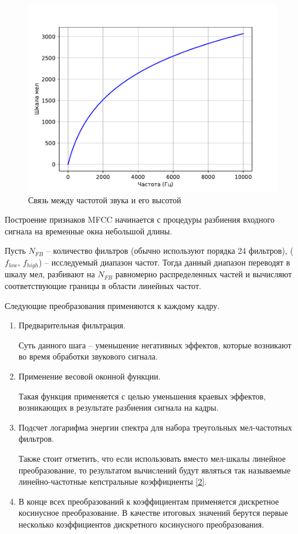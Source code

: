 \begin{figure}[h!]
	\begin{center}
	\includegraphics[pages=-]{./inc/img/1.pdf}
	\caption{Связь между частотой звука и его высотой}  
	\label{fig:xray}
\end{center}
\end{figure}

Построение признаков MFCC начинается с процедуры разбиения входного сигнала на временные окна небольшой длины.
	
Пусть $N_{FB}$ -- количество фильтров (обычно используют порядка 24 фильтров), ($f_{low}$, $f_{high}$) -- исследуемый диапазон частот. Тогда данный диапазон переводят в шкалу мел, разбивают на $N_{FB}$ равномерно распределенных частей и вычисляют соответствующие границы в области линейных частот.

Следующие преобразования применяются к каждому кадру. 
\begin{enumerate}
	\item Предварительная фильтрация.
	
	Суть данного шага -- уменьшение негативных эффектов, которые возникают во время обработки звукового сигнала. 
	
	\item Применение весовой оконной функции.
	
	Такая функция применяется с целью уменьшения краевых эффектов, возникающих в результате разбиения сигнала на кадры.
	
	\item Подсчет логарифма энергии спектра для набора треугольных мел-\newline частотных фильтров.
	
	Также стоит отметить, что если использовать вместо мел-шкалы линейное преобразование, то результатом вычислений будут являться так называемые линейно-частотные кепстральные коэффициенты \ref{2}.
	
	\item В конце всех преобразований к коэффициентам применяется дискретное косинусное преобразование. В качестве итоговых значений берутся первые несколько коэффициентов дискретного косинусного преобразования.
	
\end{enumerate}

